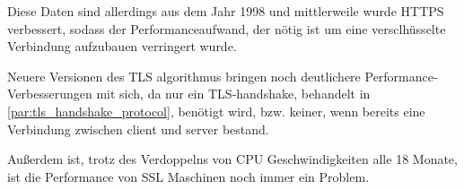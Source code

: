 \begin{table}[htpb]
\caption[Parameter linearer Anpassungen an HTTP- und HTTPS-Übertragungen]{Parameter linearer Anpassungen an HTTP- und HTTPS-Übertragungen\footnotemark}
\label{tab:HTTPS}
\end{table}
Diese Daten sind allerdings aus dem Jahr 1998 und mittlerweile wurde \ac{HTTPS} verbessert, sodass der Performanceaufwand, der nötig ist um eine versclhüsselte Verbindung aufzubauen verringert wurde\autocite[\vglf][]{CloudfareWarumHTTPS:online}.

Neuere Versionen des \ac{TLS} \gls{algorithmus} bringen noch deutlichere Performance-Verbesserungen mit sich, da \uam nur ein \ac{TLS}-\gls{handshake}, behandelt in \autoref{par:tls_handshake_protocol}, benötigt wird, bzw. keiner, wenn bereits eine Verbindung zwischen \gls{client} und \gls{server} bestand\autocite[\vglf][]{CloudfareWarumHTTPS:online}.

Außerdem ist, trotz des Verdoppelns von CPU Geschwindigkeiten alle 18 Monate, ist die Performance von \ac{SSL} Maschinen noch immer ein Problem.\autocite[\vglf][]{cryptoeprint:2006/212}

